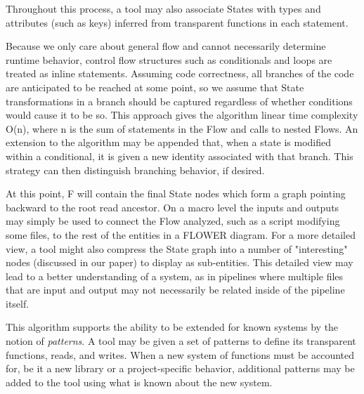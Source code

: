 \documentclass{llncs}
\newcommand{\+}{\discretionary{\mbox{${\bm\cdot}\mkern-1mu$}}{}{}}
\begin{document}
Throughout this process, a tool may also associate States with types and attributes (such as keys) inferred from transparent functions in each statement.

Because we only care about general flow and cannot necessarily determine runtime behavior, control flow structures such as conditionals and loops are treated as inline statements. Assuming code correctness, all branches of the code are anticipated to be reached at some point, so we assume that State transformations in a branch should be captured regardless of whether conditions would cause it to be so. This approach gives the algorithm linear time complexity O(n), where n is the sum of statements in the Flow and calls to nested Flows. An extension to the algorithm may be appended that, when a state is modified within a conditional, it is given a new identity associated with that branch. This strategy can then distinguish branching behavior, if desired.

At this point, F will contain the final State nodes which form a graph pointing backward to the root read ancestor. On a macro level the inputs and outputs may simply be used to connect the Flow analyzed, such as a script modifying some files, to the rest of the entities in a FLOWER diagram. For a more detailed view, a tool might also compress the State graph into a number of "interesting" nodes (discussed in our paper) to display as sub-entities. This detailed view may lead to a better understanding of a system, as in pipelines where multiple files that are input and output may not necessarily be related inside of the pipeline itself.

This algorithm supports the ability to be extended for known systems by the notion of \textit{patterns}. A tool may be given a set of patterns to define its transparent functions, reads, and writes. When a new system of functions must be accounted for, be it a new library or a project-specific behavior, additional patterns may be added to the tool using what is known about the new system.
\end{document}
